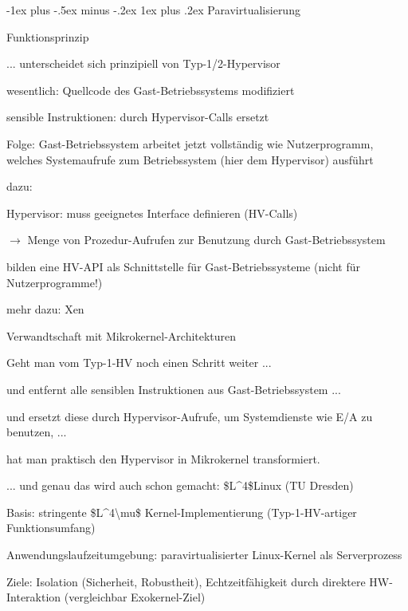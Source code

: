 \documentclass[a4paper]{article}
\makeatletter
\renewcommand{\subsubsection}{\@startsection{subsubsection}{3}{0mm}%
 {-1ex plus -.5ex minus -.2ex}%
 {1ex plus .2ex}%
 {\normalfont\small\bfseries}}
\makeatother
\begin{document}
\begin{multicols}{3}
    \subsubsection{Paravirtualisierung}

    Funktionsprinzip

    \begin{itemize*}
        \item
        ... unterscheidet sich prinzipiell von Typ-1/2-Hypervisor
        \item
        wesentlich: Quellcode des Gast-Betriebssystems modifiziert
        \item
        sensible Instruktionen: durch Hypervisor-Calls ersetzt
        \item
        Folge: Gast-Betriebssystem arbeitet jetzt vollständig wie
        Nutzerprogramm, welches Systemaufrufe zum Betriebssystem (hier dem
        Hypervisor) ausführt
        \item
        dazu:
        \begin{itemize*}
            \item Hypervisor: muss geeignetes Interface definieren (HV-Calls)
            \item $\rightarrow$  Menge von Prozedur-Aufrufen zur Benutzung durch Gast-Betriebssystem
            \item bilden eine HV-API als Schnittstelle für Gast-Betriebssysteme (nicht für Nutzerprogramme!)
        \end{itemize*}
        \item
        mehr dazu: Xen
    \end{itemize*}

    Verwandtschaft mit Mikrokernel-Architekturen

    \begin{itemize*}
        \item
        Geht man vom Typ-1-HV noch einen Schritt weiter ...
        \begin{itemize*}
            \item und entfernt alle sensiblen Instruktionen aus Gast-Betriebssystem ...
            \item und ersetzt diese durch Hypervisor-Aufrufe, um Systemdienste wie E/A zu benutzen, ...
            \item hat man praktisch den Hypervisor in Mikrokernel transformiert.
        \end{itemize*}
        \item
        ... und genau das wird auch schon gemacht: \$L\^{}4\$Linux (TU
        Dresden)
        \begin{itemize*}
            \item Basis: stringente \$L\^{}4\textbackslash mu\$ Kernel-Implementierung (Typ-1-HV-artiger Funktionsumfang)
            \item Anwendungslaufzeitumgebung: paravirtualisierter Linux-Kernel als Serverprozess
            \item Ziele: Isolation (Sicherheit, Robustheit), Echtzeitfähigkeit durch direktere HW-Interaktion (vergleichbar Exokernel-Ziel)
        \end{itemize*}
    \end{itemize*}


\end{multicols}
\end{document}
